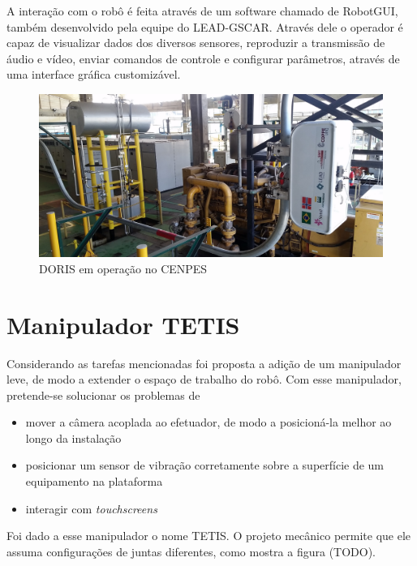 A interação com o robô é feita através de um software chamado de RobotGUI, também desenvolvido pela equipe do LEAD-GSCAR. Através dele o operador é capaz de visualizar dados dos diversos sensores, reproduzir a transmissão de áudio e vídeo, enviar comandos de controle e configurar parâmetros, através de uma interface gráfica customizável. 

\begin{figure}[!ht]
\centering
  \includegraphics[width=\linewidth]{./img/cenpes_field.jpg}
  \caption{DORIS em operação no CENPES}
  \label{fig:cenpes_doris}
\end{figure}%

\section{Manipulador TETIS}
Considerando as tarefas mencionadas foi proposta a adição de um manipulador leve, de modo a extender o espaço de trabalho do robô. Com esse manipulador, pretende-se solucionar os problemas de
\begin{itemize}
\item mover a câmera acoplada ao efetuador, de modo a posicioná-la melhor ao longo da instalação
\item posicionar um sensor de vibração corretamente sobre a superfície de um equipamento na plataforma
\item interagir com \textit{touchscreens}
\end{itemize}

Foi dado a esse manipulador o nome TETIS. O projeto mecânico permite que ele assuma configurações de juntas diferentes, como mostra a figura (TODO). 

